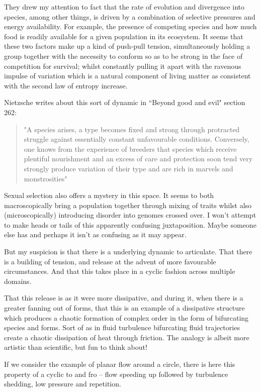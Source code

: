 They drew my attention to fact that the rate of evolution and divergence into species,  among other things,  is driven by a combination of selective pressures and energy availability.  For example,  the presence of competing species and how much food is readily available for a given population in its ecosystem.  It seems that these two factors make up a kind of push-pull tension,  simultaneously holding a group together with the necessity to conform so as to be strong in the face of competition for survival; whilst constantly pulling it apart with the ravenous impulse of variation which is a natural component of living matter as consistent with the second law of entropy increase. \par

Nietzsche writes about this sort of dynamic in ``Beyond good and evil" section 262:

\begin{quotation}
\noindent
"A species arises, a type becomes fixed and strong through protracted struggle against essentially constant unfavourable conditions. Conversely, one knows from the experience of breeders that species which receive plentiful nourishment and an excess of care and protection soon tend very strongly produce variation of their type and are rich in marvels and monstrosities"
\end{quotation}

\noindent
Sexual selection also offers a mystery in this space.  It seems to both macroscopically bring a population together through mixing of traits whilst also (microscopically) introducing disorder into genomes crossed over.  I won't attempt to make heads or tails of this apparently confusing juxtaposition.  Maybe someone else has and perhaps it isn't as confusing as it may appear. \par 

\vspace{10pt}

\noindent
 
\noindent
But my suspicion is that there is a underlying dynamic to articulate.  That there is a building of tension,  and release at the advent of more favourable circumstances.  And that this takes place in a cyclic fashion across multiple domains. \par

That this release is as it were more dissipative,  and during it,  when there is a greater fanning out of forms,  that this is an example of a dissipative structure which produces a chaotic formation of complex order in the form of bifurcating species and forms.  Sort of as in fluid turbulence bifurcating fluid trajectories create a chaotic dissipation of heat through friction.  The analogy is albeit more artistic than scientific,  but fun to think about! \par
If we consider the example of planar flow around a circle,  there is here this property of a cyclic to and fro -- flow speeding up followed by turbulence shedding,  low pressure and repetition. 


